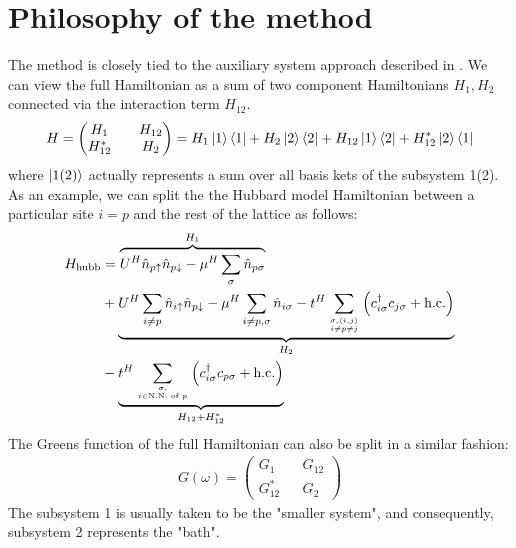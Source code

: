 \documentclass{article}
\numberwithin{equation}{section}
\begin{document}
\section{Philosophy of the method}
The method is closely tied to the auxiliary system approach described in \cite{martin_2016}. We can view the full Hamiltonian as a sum of two component Hamiltonians \(H_1, H_2\) connected via the interaction term \(H_{12}\).
\begin{equation}\begin{aligned}
	H = \begin{pmatrix} H_1 && H_{12} \\ H_{12}^* && H_2 \end{pmatrix} = H_1 \ket{1}\bra{1} + H_2\ket{2}\bra{2} + H_{12}\ket{1}\bra{2} + H_{12}^*\ket{2}\bra{1}
\end{aligned}\end{equation}
where \(\ket{1(2)}\) actually represents a sum over all basis kets of the subsystem 1(2). As an example, we can split the the Hubbard model Hamiltonian between a particular site \(i = p\) and the rest of the lattice as follows:
\begin{equation}\begin{aligned}
	H_\text{hubb} &= \overbrace{U^H\hat n_{p \uparrow} \hat n_{p \downarrow} - \mu^H \sum_\sigma \hat n_{p \sigma}}^{H_1} \\
		      &+ \underbrace{U^H\sum_{i \neq p}\hat n_{i \uparrow} \hat n_{p \downarrow} - \mu^H \sum_{i \neq p, \sigma} \hat n_{i \sigma} -t^H\sum_{\sigma,\left<i,j \right>\atop{i \neq p \neq j}}\left(c^\dagger_{i\sigma} c_{j\sigma} + \text{h.c.}\right)}_{H_2}\\
		      & -\underbrace{t^H\sum_{\sigma,\atop{i \in \text{N.N. of }p}}\left(c^\dagger_{i\sigma} c_{p\sigma} + \text{h.c.}\right)}_{H_{12} + H_{12}^*}\\
\end{aligned}\end{equation}
The Greens function of the full Hamiltonian can also be split in a similar fashion:
\begin{equation}\begin{aligned}
	G(\omega) = \begin{pmatrix} G_1 && G_{12} \\ G_{12}^* && G_2 \end{pmatrix} 
\end{aligned}\end{equation}
The subsystem 1 is usually taken to be the "smaller system", and consequently, subsystem 2 represents the "bath".
\end{document}
